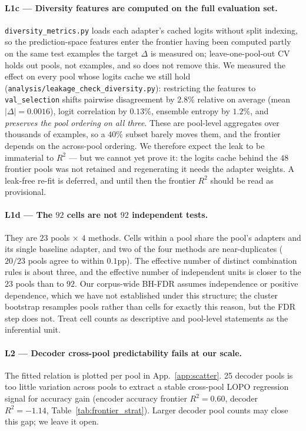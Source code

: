 \documentclass[11pt]{article}
\begin{document}
\paragraph{L1c — Diversity features are computed on the full evaluation set.} \texttt{diversity\_\allowbreak metrics.\allowbreak py} loads each adapter's cached logits without split indexing, so the prediction-space features enter the frontier having been computed partly on the same test examples the target $\Delta$ is measured on; leave-one-pool-out CV holds out pools, not examples, and so does not remove this. We measured the effect on every pool whose logits cache we still hold (\texttt{analysis/\allowbreak leakage\_\allowbreak check\_\allowbreak diversity.\allowbreak py}): restricting the features to \texttt{val\_selection} shifts pairwise disagreement by $2.8\%$ relative on average (mean $|\Delta|{=}0.0016$), logit correlation by $0.13\%$, ensemble entropy by $1.2\%$, and \emph{preserves the pool ordering on all three}. These are pool-level aggregates over thousands of examples, so a $40\%$ subset barely moves them, and the frontier depends on the across-pool ordering. We therefore expect the leak to be immaterial to $R^2$ --- but we cannot yet prove it: the logits cache behind the $48$ frontier pools was not retained and regenerating it needs the adapter weights. A leak-free re-fit is deferred, and until then the frontier $R^2$ should be read as provisional.

\paragraph{L1d — The $92$ cells are not $92$ independent tests.} They are $23$ pools $\times$ $4$ methods. Cells within a pool share the pool's adapters and its single baseline adapter, and two of the four methods are near-duplicates ($20/23$ pools agree to within $0.1$pp). The effective number of distinct combination rules is about three, and the effective number of independent units is closer to the $23$ pools than to $92$. Our corpus-wide BH-FDR assumes independence or positive dependence, which we have not established under this structure; the cluster bootstrap resamples pools rather than cells for exactly this reason, but the FDR step does not. Treat cell counts as descriptive and pool-level statements as the inferential unit.

\paragraph{L2 — Decoder cross-pool predictability fails at our scale.} The fitted relation is plotted per pool in App.~\ref{app:scatter}. 25 decoder pools is too little variation across pools to extract a stable cross-pool LOPO regression signal for accuracy gain (encoder accuracy frontier $R^2{=}0.60$, decoder $R^2{=}{-}1.14$, Table~\ref{tab:frontier_strat}). Larger decoder pool counts may close this gap; we leave it open.
\end{document}

